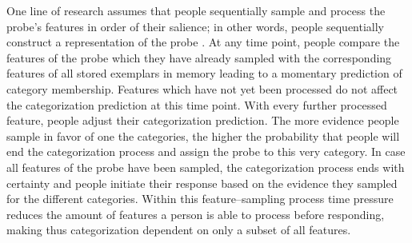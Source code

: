 \documentclass[a4paper,man,natbib]{apa6}
\begin{document}
One line of research assumes that people sequentially sample and process the probe's features in order of their salience; in other words, people sequentially construct a representation of the probe \citep{lamberts1995categorization, lamberts2000information, lamberts2002feature}. At any time point, people compare the features of the probe which they have already sampled with the corresponding features of all stored exemplars in memory leading to a momentary prediction of category membership. Features which have not yet been processed do not affect the categorization prediction at this time point. With every further processed feature, people adjust their categorization prediction. The more evidence people sample in favor of one the categories, the higher the probability that people will end the categorization process and assign the probe to this very category. In case all features of the probe have been sampled, the categorization process ends with certainty and people initiate their response based on the evidence they sampled for the different categories. Within this feature--sampling process time pressure reduces the amount of features a person is able to process before responding, making thus categorization dependent on only a subset of all features. 
\end{document}

